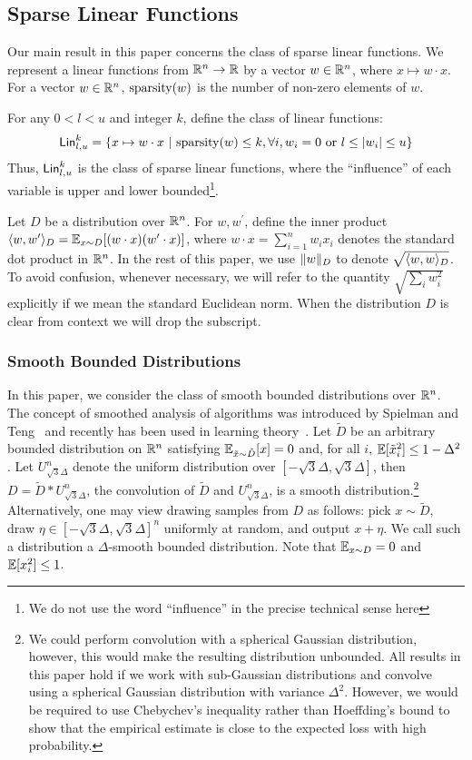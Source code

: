 \subsection{Sparse Linear Functions} 
\label{sec:notation-class}

Our main result in this paper concerns the class of sparse linear functions.  We
represent a linear functions from $\mathbb{R}^n \rightarrow \mathbb{R}$ by a vector $w
\in \mathbb{R}^n$, where $x \mapsto w \cdot x$.  For a vector $w \in \mathbb{R}^n$,
$\mathrm{sparsity}(w)$ is the number of non-zero elements of $w$.

For any $0 < l < u$ and integer $k$, define the class of linear functions:
\[
\mathsf{Lin}^k_{l, u} = \{ x \mapsto w \cdot x ~|~ \mathrm{sparsity}(w) \leq k, \forall i,
w_i = 0 \mbox{ or } l \leq |w_i| \leq u \}
\]
Thus, $\mathsf{Lin}^k_{l, u}$ is the class of sparse linear functions, where the
``influence'' of each variable is upper and lower bounded\footnote{We do not use
the word ``influence'' in the precise technical sense here}.

Let $D$ be a distribution over $\mathbb{R}^n$. For $w, w^\prime$, define the inner
product $\langle w, w^\prime \rangle_D = \mathbb{E}_{x \sim D}[(w \cdot x) (w^\prime \cdot x)]$,
where $w \cdot x = \sum_{i = 1}^n w_i x_i$ denotes the standard dot product
in $\mathbb{R}^n$. In the rest of this paper, we use $\Vert w \Vert_D$ to denote
$\sqrt{\langle w, w \rangle_D}$. To avoid confusion, whenever necessary, we
will refer to the quantity $\sqrt{\sum_{i} w_i^2}$ explicitly if we mean the standard
Euclidean norm. When the distribution $D$ is clear from context we will drop
the subscript.

\subsubsection*{Smooth Bounded Distributions}

In this paper, we consider the class of smooth bounded distributions over
$\mathbb{R}^n$. The concept of smoothed analysis of algorithms was introduced by
Spielman and Teng~\cite{ST:2001} and recently has been used in learning
theory~\cite{KST:2009,KKM:2013}.  Let $\tilde{D}$ be an arbitrary bounded
distribution on $\mathbb{R}^n$ satisfying $\mathbb{E}_{\tilde{x} \sim \tilde{D}}[x]=0$ and,
for all $i$, $\mathbb{E}[\tilde{x}_i^2] \leq 1 - \Delta^2$.  Let
$U^n_{\sqrt{3}\Delta}$ denote the uniform distribution over $[-\sqrt{3} \Delta,
\sqrt{3}\Delta]$, then $D = \tilde{D}* U^n_{\sqrt{3} \Delta}$, the
convolution of $\tilde{D}$ and $U^n_{\sqrt{3}\Delta}$, is a smooth
distribution.\footnote{We could perform convolution with a spherical
Gaussian distribution, however, this would make the resulting distribution
unbounded. All results in this paper hold if we work with sub-Gaussian
distributions and convolve using a spherical Gaussian distribution with variance
$\Delta^2$. However, we would be required to use Chebychev's inequality
rather than Hoeffding's bound to show that the empirical estimate is close to
the expected loss with high probability.} Alternatively, one may view drawing
samples from $D$ as follows: pick $x \sim \tilde{D}$, draw $\eta \in [-\sqrt{3}
\Delta, \sqrt{3} \Delta]^n$ uniformly at random, and output $x + \eta$. We call
such a distribution a $\Delta$-smooth bounded distribution. Note that $\mathbb{E}_{x
\sim D} = 0$ and $\mathbb{E}[x_i^2] \leq 1$.

